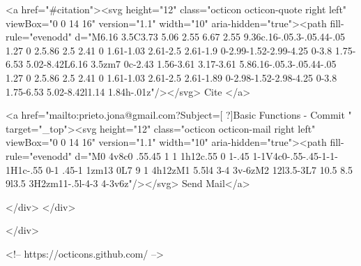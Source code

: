       <a  href="#citation"><svg height="12" class="octicon octicon-quote right left" viewBox="0 0 14 16" version="1.1" width="10" aria-hidden="true"><path fill-rule="evenodd" d="M6.16 3.5C3.73 5.06 2.55 6.67 2.55 9.36c.16-.05.3-.05.44-.05 1.27 0 2.5.86 2.5 2.41 0 1.61-1.03 2.61-2.5 2.61-1.9 0-2.99-1.52-2.99-4.25 0-3.8 1.75-6.53 5.02-8.42L6.16 3.5zm7 0c-2.43 1.56-3.61 3.17-3.61 5.86.16-.05.3-.05.44-.05 1.27 0 2.5.86 2.5 2.41 0 1.61-1.03 2.61-2.5 2.61-1.89 0-2.98-1.52-2.98-4.25 0-3.8 1.75-6.53 5.02-8.42l1.14 1.84h-.01z"/></svg> Cite
      </a>

      <a href="mailto:prieto.jona@gmail.com?Subject=[ ?]Basic Functions - Commit " target="_top"><svg height="12" class="octicon octicon-mail right left" viewBox="0 0 14 16" version="1.1" width="10" aria-hidden="true"><path fill-rule="evenodd" d="M0 4v8c0 .55.45 1 1 1h12c.55 0 1-.45 1-1V4c0-.55-.45-1-1-1H1c-.55 0-1 .45-1 1zm13 0L7 9 1 4h12zM1 5.5l4 3-4 3v-6zM2 12l3.5-3L7 10.5 8.5 9l3.5 3H2zm11-.5l-4-3 4-3v6z"/></svg> Send Mail</a>

    </div>
  </div>

</div>

<!-- https://octicons.github.com/ -->





